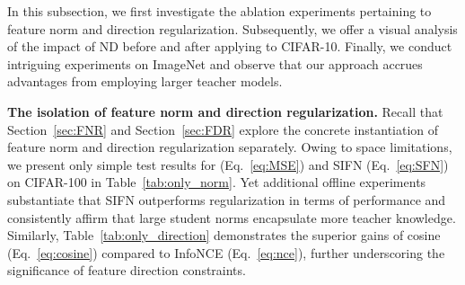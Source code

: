 \documentclass{article}
\begin{document}
In this subsection, we first investigate the ablation experiments pertaining to feature norm and direction regularization. Subsequently, we offer a visual analysis of the impact of ND before and after applying to CIFAR-10. Finally, we conduct intriguing experiments on ImageNet and observe that our approach accrues advantages from employing larger teacher models.


\textbf{The isolation of feature norm and direction regularization.} 
Recall that Section~\ref{sec:FNR} and Section~\ref{sec:FDR} explore the concrete instantiation of feature norm and direction regularization separately. Owing to space limitations, we present only simple test results for  (Eq.~\ref{eq:MSE}) and SIFN (Eq.~\ref{eq:SFN}) on CIFAR-100 in Table~\ref{tab:only_norm}. Yet additional offline experiments substantiate that SIFN outperforms  regularization in terms of performance and consistently affirm that large student norms encapsulate more teacher knowledge. Similarly, Table~\ref{tab:only_direction} demonstrates the superior gains of cosine (Eq.~\ref{eq:cosine}) compared to InfoNCE (Eq.~\ref{eq:nce}), further underscoring the significance of feature direction constraints.
\end{document}
